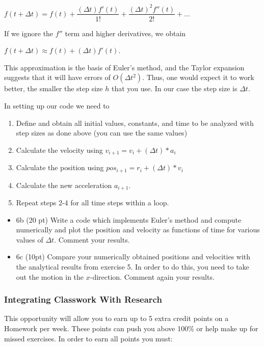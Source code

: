 \documentclass[11pt]{article}
\begin{document}
\(f(t+\Delta t) = f(t) + \dfrac{(\Delta t)f'(t)}{1!} + \dfrac{(\Delta t)^2f''(t)}{2!} + ...\)

If we ignore the \(f''\) term and higher derivatives, we obtain

\(f(t+\Delta t) \approx f(t) + (\Delta t)f'(t)\).

This approximation is the basis of Euler's method, and the Taylor
expansion suggests that it will have errors of \(O(\Delta t^2)\). Thus,
one would expect it to work better, the smaller the step size \(h\) that
you use. In our case the step size is \(\Delta t\).

In setting up our code we need to

\begin{enumerate}
\def\labelenumi{\arabic{enumi}.}
\item
  Define and obtain all initial values, constants, and time to be
  analyzed with step sizes as done above (you can use the same values)
\item
  Calculate the velocity using \(v_{i+1} = v_{i} + (\Delta t)*a_{i}\)
\item
  Calculate the position using \(pos_{i+1} = r_{i} + (\Delta t)*v_{i}\)
\item
  Calculate the new acceleration \(a_{i+1}\).
\item
  Repeat steps 2-4 for all time steps within a loop.
\end{enumerate}

\begin{itemize}
\item
  6b (20 pt) Write a code which implements Euler's method and compute
  numerically and plot the position and velocity as functions of time
  for various values of \(\Delta t\). Comment your results.
\item
  6c (10pt) Compare your numerically obtained positions and velocities
  with the analytical results from exercise 5. In order to do this, you
  need to take out the motion in the \(x\)-direction. Comment again your
  results.
\end{itemize}

    \subsubsection{Integrating Classwork With
Research}\label{integrating-classwork-with-research}

This opportunity will allow you to earn up to 5 extra credit points on a
Homework per week. These points can push you above 100\% or help make up
for missed exercises. In order to earn all points you must:
\end{document}
